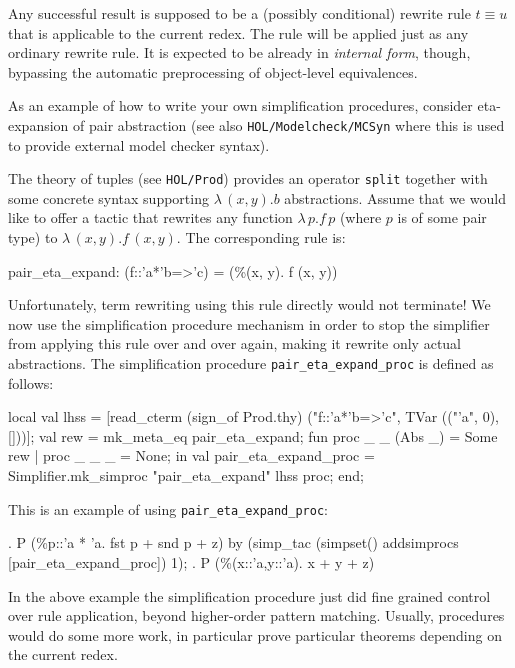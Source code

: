 Any successful result is supposed to be a (possibly conditional)
rewrite rule $t \equiv u$ that is applicable to the current redex.
The rule will be applied just as any ordinary rewrite rule.  It is
expected to be already in \emph{internal form}, though, bypassing the
automatic preprocessing of object-level equivalences.

\medskip

As an example of how to write your own simplification procedures,
consider eta-expansion of pair abstraction (see also
\texttt{HOL/Modelcheck/MCSyn} where this is used to provide external
model checker syntax).
  
The {\HOL} theory of tuples (see \texttt{HOL/Prod}) provides an
operator \texttt{split} together with some concrete syntax supporting
$\lambda\,(x,y).b$ abstractions.  Assume that we would like to offer a
tactic that rewrites any function $\lambda\,p.f\,p$ (where $p$ is of
some pair type) to $\lambda\,(x,y).f\,(x,y)$.  The corresponding rule
is:
\begin{ttbox}
pair_eta_expand:  (f::'a*'b=>'c) = (\%(x, y). f (x, y))
\end{ttbox}
Unfortunately, term rewriting using this rule directly would not
terminate!  We now use the simplification procedure mechanism in order
to stop the simplifier from applying this rule over and over again,
making it rewrite only actual abstractions.  The simplification
procedure \texttt{pair_eta_expand_proc} is defined as follows:
\begin{ttbox}
local
  val lhss =
    [read_cterm (sign_of Prod.thy) ("f::'a*'b=>'c", TVar (("'a", 0), []))];
  val rew = mk_meta_eq pair_eta_expand; \medskip
  fun proc _ _ (Abs _) = Some rew
    | proc _ _ _ = None;
in
  val pair_eta_expand_proc = Simplifier.mk_simproc "pair_eta_expand" lhss proc;
end;
\end{ttbox}
This is an example of using \texttt{pair_eta_expand_proc}:
\begin{ttbox}
{. P (\%p::'a * 'a. fst p + snd p + z)}
by (simp_tac (simpset() addsimprocs [pair_eta_expand_proc]) 1);
{. P (\%(x::'a,y::'a). x + y + z)}
\end{ttbox}

\medskip

In the above example the simplification procedure just did fine
grained control over rule application, beyond higher-order pattern
matching.  Usually, procedures would do some more work, in particular
prove particular theorems depending on the current redex.

